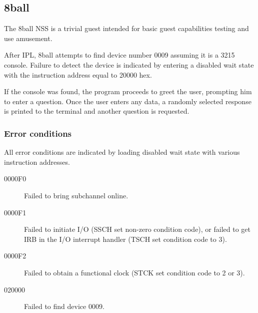 \subsection{8ball}
The 8ball NSS is a trivial guest intended for basic guest capabilities
testing and use amusement.

After IPL, 8ball attempts to find device number \mbox{0009} assuming it is a
3215 console.  Failure to detect the device is indicated by entering a
disabled wait state with the instruction address equal to 20000 hex.

If the console was found, the program proceeds to greet the user, prompting
him to enter a question.  Once the user enters any data, a randomly selected
response is printed to the terminal and another question is requested.

\subsubsection*{Error conditions}
All error conditions are indicated by loading disabled wait state with
various instruction addresses.

\begin{description}
\item[0000F0] Failed to bring subchannel online.
\item[0000F1] Failed to initiate I/O (SSCH set non-zero condition code), or
	failed to get IRB in the I/O interrupt handler (TSCH set condition
	code to 3).
\item[0000F2] Failed to obtain a functional clock (STCK set condition code to
	2 or 3).
\item[020000] Failed to find device 0009.
\end{description}
